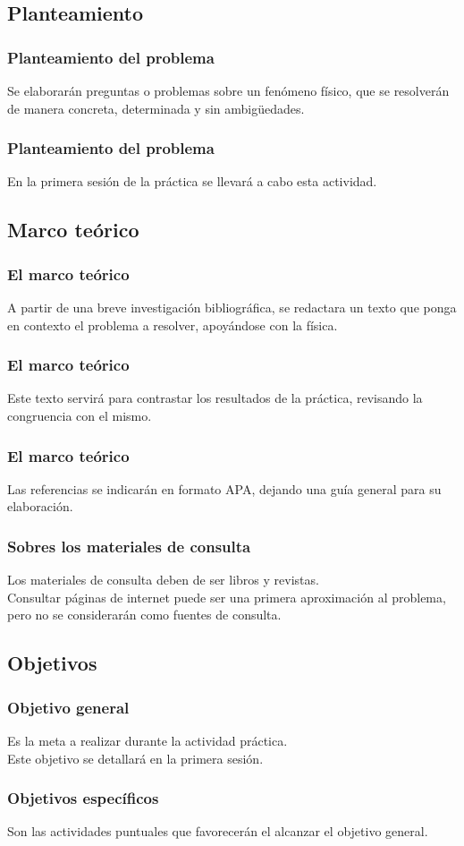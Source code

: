 \documentclass[14pt]{beamer}
\begin{document}
\subsection{Planteamiento}

\begin{frame}
\frametitle{Planteamiento del problema}
Se elaborarán preguntas o problemas sobre un fenómeno físico, \pause que se resolverán de manera concreta, \pause determinada \pause y sin ambigüedades.
\end{frame}
\begin{frame}
\frametitle{Planteamiento del problema}
En la primera sesión de la práctica se llevará a cabo esta actividad.
\end{frame}

\subsection{Marco teórico}

\begin{frame}
\frametitle{El marco teórico}
A partir de una breve investigación bibliográfica, se redactara un texto que ponga en contexto el problema a resolver, apoyándose con la física.
\end{frame}
\begin{frame}
\frametitle{El marco teórico}
Este texto servirá para contrastar los resultados de la práctica, \pause revisando la congruencia con el mismo.
\end{frame}
\begin{frame}
\frametitle{El marco teórico}
Las referencias se indicarán en formato APA, dejando una guía general para su elaboración.
\end{frame}
\begin{frame}
\frametitle{Sobres los materiales de consulta}
Los materiales de consulta deben de ser libros y revistas.
\\
\bigskip
\pause
Consultar páginas de internet puede ser una primera aproximación al problema, pero no se considerarán como fuentes de consulta.
\end{frame}

\subsection{Objetivos}

\begin{frame}
\frametitle{Objetivo general}
Es la meta a realizar durante la actividad práctica.
\\
\bigskip
\pause
Este objetivo se detallará en la primera sesión.
\end{frame}
\begin{frame}
\frametitle{Objetivos específicos}
Son las actividades puntuales que favorecerán el alcanzar el objetivo general.
\end{frame}
\end{document}
